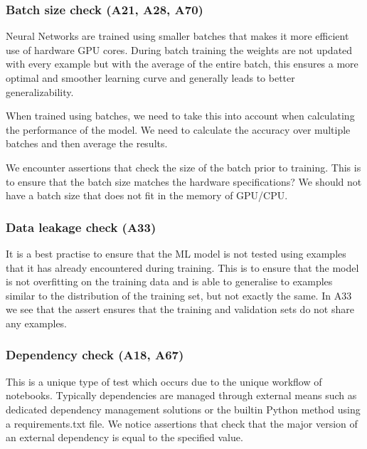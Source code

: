 \subsubsection{Batch size check (A21, A28, A70)}

Neural Networks are trained using smaller batches that makes it more efficient use of hardware GPU cores. During batch training the weights are not updated with every example but with the average of the entire batch, this ensures a more optimal and smoother learning curve and generally leads to better generalizability.

When trained using batches, we need to take this into account when calculating the performance of the model. We need to calculate the accuracy over multiple batches and then average the results.

We encounter assertions that check the size of the batch prior to training. This is to ensure that the batch size matches the hardware specifications? We should not have a batch size that does not fit in the memory of GPU/CPU.


\subsubsection{Data leakage check (A33)}

It is a best practise to ensure that the ML model is not tested using examples that it has already encountered during training. This is to ensure that the model is not overfitting on the training data and is able to generalise to examples similar to the distribution of the training set, but not exactly the same. In A33 we see that the assert ensures that the training and validation sets do not share any examples.

\subsubsection{Dependency check (A18, A67)}

This is a unique type of test which occurs due to the unique workflow of notebooks. Typically dependencies are managed through external means such as dedicated dependency management solutions or the builtin Python method using a requirements.txt file. We notice assertions that check that the major version of an external dependency is equal to the specified value.

